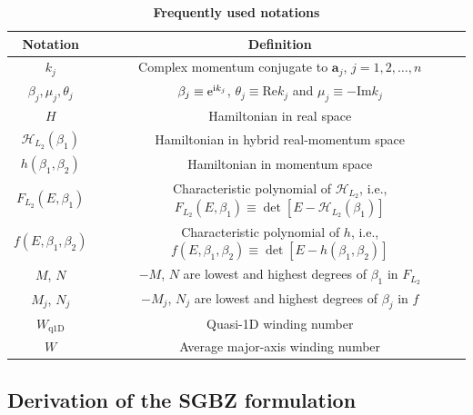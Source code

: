 \begin{table}
\centering

\caption{\textbf{Frequently used notations}}
\label{tab:notation}

\begin{tabular}{|c|c|}
\hline 
Notation  & Definition\tabularnewline
\hline 
\hline 
$k_{j}$  & Complex momentum conjugate to $\mathbf{a}_{j}$, $j=1,2,\dots,n$\tabularnewline
\hline 
$\beta_{j},\mu_{j},\theta_{j}$  & $\beta_{j}\equiv\mathrm{e}^{\mathrm{i} k_{j}}$, $\theta_{j}\equiv\text{Re}k_{j}$
and $\mu_{j}\equiv-\text{Im}k_{j}$\tabularnewline
\hline 
$H$  & Hamiltonian in real space \tabularnewline
\hline 
$\mathcal{H}_{L_{2}}(\beta_{1})$  & Hamiltonian in hybrid real-momentum space\tabularnewline
\hline 
$h(\beta_{1},\beta_{2})$  & Hamiltonian in momentum space\tabularnewline
\hline 
$F_{L_{2}}(E,\beta_{1})$  & Characteristic polynomial of $\mathcal{H}_{L_{2}}$, i.e., $F_{L_{2}}(E,\beta_{1})\equiv\det\left[E-\mathcal{H}_{L_{2}}(\beta_{1})\right]$\tabularnewline
\hline 
$f(E,\beta_{1},\beta_{2})$  & Characteristic polynomial of $h$, i.e., $f(E,\beta_{1},\beta_{2})\equiv\det\left[E-h(\beta_{1},\beta_{2})\right]$\tabularnewline
\hline 
$M$, $N$  & $-M$, $N$ are lowest and highest degrees of $\beta_{1}$ in $F_{L_{2}}$\tabularnewline
\hline 
$M_{j}$, $N_{j}$  & $-M_{j}$, $N_{j}$ are lowest and highest degrees of $\beta_{j}$
in $f$\tabularnewline
\hline 
$W_{\text{q1D}}$  & Quasi-1D winding number\tabularnewline
\hline 
$W$  & Average major-axis winding number \tabularnewline
\hline 
\end{tabular}
\end{table}


\subsection{Derivation of the SGBZ formulation}

\label{subsec:derivation-SGBZ}

